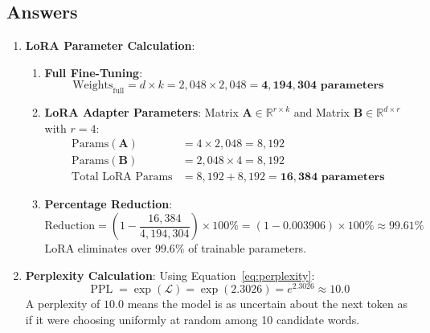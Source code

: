 \subsection*{Answers}\label{subsec:answers}

\begin{enumerate}
    \item \textbf{LoRA Parameter Calculation}:
    \begin{enumerate}[label=(\alph*)]
        \item \textbf{Full Fine-Tuning}:
        \begin{equation*}
        \text{Weights}_{\text{full}} = d \times k = 2{,}048 \times 2{,}048 = \mathbf{4{,}194{,}304 \text{ parameters}}
        \end{equation*}

        \item \textbf{LoRA Adapter Parameters}:
        Matrix $\mathbf{A} \in \mathbb{R}^{r \times k}$ and Matrix $\mathbf{B} \in \mathbb{R}^{d \times r}$ with $r = 4$:
        \begin{align*}
        \text{Params}(\mathbf{A}) &= 4 \times 2{,}048 = 8{,}192 \\
        \text{Params}(\mathbf{B}) &= 2{,}048 \times 4 = 8{,}192 \\
        \text{Total LoRA Params} &= 8{,}192 + 8{,}192 = \mathbf{16{,}384 \text{ parameters}}
        \end{align*}

        \item \textbf{Percentage Reduction}:
        \begin{equation*}
        \text{Reduction} = \left(1 - \frac{16{,}384}{4{,}194{,}304}\right) \times 100\% = (1 - 0.003906) \times 100\% \approx \mathbf{99.61\%}
        \end{equation*}
        LoRA eliminates over $99.6\%$ of trainable parameters.
    \end{enumerate}

    \item \textbf{Perplexity Calculation}:
    Using Equation~\eqref{eq:perplexity}:
    \begin{equation*}
    \operatorname{PPL} = \exp(\mathcal{L}) = \exp(2.3026) = e^{2.3026} \approx \mathbf{10.0}
    \end{equation*}
    A perplexity of $10.0$ means the model is as uncertain about the next token as if it were choosing uniformly at random among 10 candidate words.


\end{enumerate}
